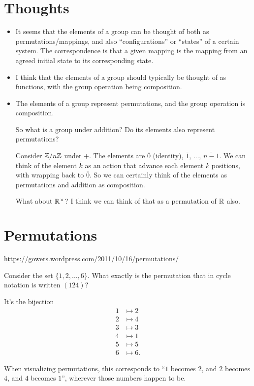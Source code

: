 \newcommand{\alphainv}{\alpha^{-1}}

\section{Thoughts}

\begin{itemize}
\item It seems that the elements of a group can be thought of both as permutations/mappings, and also ``configurations​'' or ``states​'' of a certain system. The correspondence is that a given mapping is the mapping from an agreed initial​ state to its corresponding state.
\item I think that the elements of a group should typically be thought of as functions, with the group operation
being composition.
\item The elements of a group represent permutations, and the group operation is composition.

So what is a group under addition? Do its elements also represent permutations?

Consider $\mathbb{Z}/n\mathbb{Z}$ under $+$. The elements are $\bar 0$ (identity), $\bar 1$, ..., $\bar{n - 1}$. We can think
of the element $\bar k$ as an action that advance each element $k$ positions, with wrapping back to $\bar 0$.
So we can certainly think of the elements as permutations and addition as composition.

What about $\mathbb{R}^\times$? I think we can think of that as a permutation of $\mathbb{R}$ also.
\end{itemize}


\section*{Permutations}
\url{https://gowers.wordpress.com/2011/10/16/permutations/}

Consider the set $\{1, 2, \ldots, 6\}$. What exactly is the permutation that in cycle notation is
written $(124)$?

It's the bijection
\begin{align*}
 1 &\mapsto 2\\
 2 &\mapsto 4\\
 3 &\mapsto 3\\
 4 &\mapsto 1\\
 5 &\mapsto 5\\
 6 &\mapsto 6.
\end{align*}

When visualizing permutations, this corresponds to ``$1$ becomes $2$, and $2$ becomes $4$, and $4$
becomes $1$​'', wherever those numbers happen to be.




